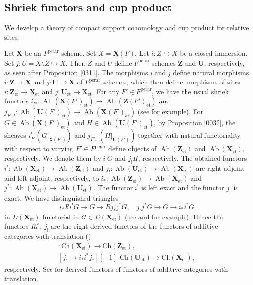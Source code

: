 \documentclass{amsart}
\theoremstyle{remark}
\numberwithin{equation}{subsection}
\newcommand{\into}{\hookrightarrow}
\newcommand{\et}{\mathrm{et}}
\newcommand{\perar}{\mathrm{perar}}
\newcommand{\alg}[1]{\mathbf{#1}}
\newcommand{\Ch}{\mathrm{Ch}}
\DeclareMathOperator{\Ab}{Ab}
\begin{document}

\subsection{Shriek functors and cup product}
\label{0381}

We develop a theory of compact support cohomology and cup product
for relative sites.

Let $\alg{X}$ be an $F^{\perar}$-scheme.
Set $X = \alg{X}(F)$.
Let $i \colon Z \into X$ be a closed immersion.
Set $j \colon U = X \setminus Z \into X$.
Then $Z$ and $U$ define $F^{\perar}$-schemes $\alg{Z}$ and $\alg{U}$, respectively,
as seen after Proposition \ref{0311}.
The morphisms $i$ and $j$ define natural morphisms
$i \colon \alg{Z} \to \alg{X}$ and $j \colon \alg{U} \to \alg{X}$ of $F^{\perar}$-schemes,
which then define morphisms of sites
$i \colon \alg{Z}_{\et} \to \alg{X}_{\et}$ and $j \colon \alg{U}_{\et} \to \alg{X}_{\et}$.
For any $F' \in F^{\perar}$,
we have the usual shriek functors
$i_{F'}^{!} \colon \Ab(\alg{X}(F')_{\et}) \to \Ab(\alg{Z}(F')_{\et})$
and $j_{F', !} \colon \Ab(\alg{U}(F')_{\et}) \to \Ab(\alg{X}(F')_{\et})$
(see \cite[Tags 0F4Z and 0F59]{Sta21} for example).
For $G \in \Ab(\alg{X}(F')_{\et})$ and $H \in \Ab(\alg{U}(F')_{\et})$,
by Proposition \ref{0032},
the sheaves $i_{F'}^{!}(G|_{\alg{X}(F')})$ and $j_{F', !}(H|_{\alg{U}(F')})$
together with natural functoriality with respect to varying $F' \in F^{\perar}$
define objects of $\Ab(\alg{Z}_{\et})$ and $\Ab(\alg{X}_{\et})$, respectively.
We denote them by $i^{!} G$ and $j_{!} H$, respectively.
The obtained functors $i^{!} \colon \Ab(\alg{X}_{\et}) \to \Ab(\alg{Z}_{\et})$
and $j_{!} \colon \Ab(\alg{U}_{\et}) \to \Ab(\alg{X}_{\et})$
are right adjoint and left adjoint, respectively,
to $i_{\ast} \colon \Ab(\alg{Z}_{\et}) \to \Ab(\alg{X}_{\et})$
and $j^{\ast} \colon \Ab(\alg{X}_{\et}) \to \Ab(\alg{U}_{\et})$.
The functor $i^{!}$ is left exact and the functor $j_{!}$ is exact.
We have distinguished triangles
	\begin{equation} \label{0461}
				i_{\ast} R i^{!} G
			\to
				G
			\to
				R j_{\ast} j^{\ast} G,
		\quad
				j_{!} j^{\ast} G
			\to
				G
			\to
				i_{\ast} i^{\ast} G
	\end{equation}
in $D(\alg{X}_{\et})$ functorial in $G \in D(\alg{X}_{\et})$
(see \cite[Lemmas 6.1.11 and 6.1.16]{BS15} and \cite[0GKL]{Sta21} for example).
Hence the functors $R i^{!}$, $j_{!}$ are the right derived functors
of the functors of additive categories with translation (\cite[Definition 10.1.1]{KS06})
	\begin{gather*}
				[i^{\ast} \to i^{\ast} j_{\ast} j^{\ast}][-1]
			\colon
				\Ch(\alg{X}_{\et})
			\to
				\Ch(\alg{Z}_{\et}),
		\\
				[j_{\ast} \to i_{\ast} i^{\ast} j_{\ast}][-1]
			\colon
				\Ch(\alg{U}_{\et})
			\to
				\Ch(\alg{X}_{\et}),
	\end{gather*}
respectively.
See \cite[Sections 13.3, 14.3]{KS06} for derived functors of functors of additive categories with translation.
\end{document}
